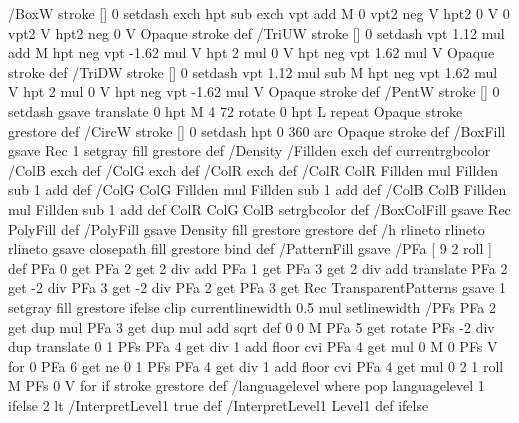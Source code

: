/BoxW {stroke [] 0 setdash exch hpt sub exch vpt add M
  0 vpt2 neg V hpt2 0 V 0 vpt2 V
  hpt2 neg 0 V Opaque stroke} def
/TriUW {stroke [] 0 setdash vpt 1.12 mul add M
  hpt neg vpt -1.62 mul V
  hpt 2 mul 0 V
  hpt neg vpt 1.62 mul V Opaque stroke} def
/TriDW {stroke [] 0 setdash vpt 1.12 mul sub M
  hpt neg vpt 1.62 mul V
  hpt 2 mul 0 V
  hpt neg vpt -1.62 mul V Opaque stroke} def
/PentW {stroke [] 0 setdash gsave
  translate 0 hpt M 4 {72 rotate 0 hpt L} repeat
  Opaque stroke grestore} def
/CircW {stroke [] 0 setdash 
  hpt 0 360 arc Opaque stroke} def
/BoxFill {gsave Rec 1 setgray fill grestore} def
/Density {
  /Fillden exch def
  currentrgbcolor
  /ColB exch def /ColG exch def /ColR exch def
  /ColR ColR Fillden mul Fillden sub 1 add def
  /ColG ColG Fillden mul Fillden sub 1 add def
  /ColB ColB Fillden mul Fillden sub 1 add def
  ColR ColG ColB setrgbcolor} def
/BoxColFill {gsave Rec PolyFill} def
/PolyFill {gsave Density fill grestore grestore} def
/h {rlineto rlineto rlineto gsave closepath fill grestore} bind def
%
%
/PatternFill {gsave /PFa [ 9 2 roll ] def
  PFa 0 get PFa 2 get 2 div add PFa 1 get PFa 3 get 2 div add translate
  PFa 2 get -2 div PFa 3 get -2 div PFa 2 get PFa 3 get Rec
  TransparentPatterns {} {gsave 1 setgray fill grestore} ifelse
  clip
  currentlinewidth 0.5 mul setlinewidth
  /PFs PFa 2 get dup mul PFa 3 get dup mul add sqrt def
  0 0 M PFa 5 get rotate PFs -2 div dup translate
  0 1 PFs PFa 4 get div 1 add floor cvi
	{PFa 4 get mul 0 M 0 PFs V} for
  0 PFa 6 get ne {
	0 1 PFs PFa 4 get div 1 add floor cvi
	{PFa 4 get mul 0 2 1 roll M PFs 0 V} for
 } if
  stroke grestore} def
%
/languagelevel where
 {pop languagelevel} {1} ifelse
 2 lt
	{/InterpretLevel1 true def}
	{/InterpretLevel1 Level1 def}
 ifelse
%
%
